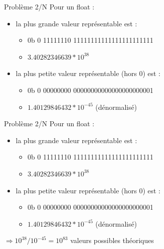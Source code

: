 \documentclass{beamer}
\begin{document}
  \begin{frame}{Problème 2/N}
Pour un float :
\begin{itemize}
\item la plus grande valeur représentable est : 
\begin{itemize}
\item 0b \textcolor{SignColor}{0} \textcolor{ExponentColor}{11111110} \textcolor{FractionColor}{11111111111111111111111}
\item $3.40282346639*10^{38}$
\end{itemize}
\item la plus petite valeur représentable (hors 0) est : 
\begin{itemize}
\item 0b \textcolor{SignColor}{0} \textcolor{ExponentColor}{00000000} \textcolor{FractionColor}{00000000000000000000001}
\item $1.40129846432*10^{-45}$ (dénormalisé)
\end{itemize}
\end{itemize}
\bigbreak
\begin{huge}
\textcolor{white}{ }
\end{huge}
  \end{frame}
  
  \begin{frame}{Problème 2/N}
Pour un float :
\begin{itemize}
\item la plus grande valeur représentable est : 
\begin{itemize}
\item 0b \textcolor{SignColor}{0} \textcolor{ExponentColor}{11111110} \textcolor{FractionColor}{11111111111111111111111}
\item $3.40282346639*10^{38}$
\end{itemize}
\item la plus petite valeur représentable (hors 0) est : 
\begin{itemize}
\item 0b \textcolor{SignColor}{0} \textcolor{ExponentColor}{00000000} \textcolor{FractionColor}{00000000000000000000001}
\item $1.40129846432*10^{-45}$ (dénormalisé)
\end{itemize}
\end{itemize}
\bigbreak
\begin{Large}
$\Rightarrow 10^{38} / 10^{-45} = 10^{83}$ valeurs possibles théoriques
\end{Large}
  \end{frame}
  
\end{document}
